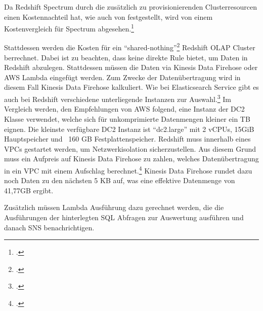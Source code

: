 Da Redshift Spectrum durch die zusätzlich zu provisionierenden Clusterresourcen einen Kostennachteil hat, wie auch von \citeauthor{Tan.2019} festgestellt, wird von einem Kostenvergleich für Spectrum abgesehen.\footcite[Vgl.][2178]{Tan.2019}

Stattdessen werden die Kosten für ein \enquote{shared-nothing}\footcite[Vgl.][2172]{Tan.2019} Redshift \ac{OLAP} Cluster berrechnet. Dabei ist zu beachten, dass \AWSIOT{} keine direkte Rule bietet, um Daten in Redshift abzulegen. Stattdessen müssen die Daten via Kinesis Data Firehose oder \ac{AWS} Lambda eingefügt werden. Zum Zwecke der Datenübertragung wird in diesem Fall Kinesis Data Firehose kalkuliert. Wie bei Elasticsearch Service gibt es auch bei Redshift verschiedene unterliegende Instanzen zur Auswahl.\footcite[Vgl. auch im Folgenden][]{AmazonWebServicesInc..o.J.z} Im Vergleich werden, den Empfehlungen von \ac{AWS} folgend, eine Instanz der \ac{DC2} Klasse verwendet, welche sich für unkomprimierte Datenmengen kleiner ein TB eignen. Die kleinste verfügbare \ac{DC2} Instanz ist \enquote{dc2.large} mit 2 vCPUs, 15GiB Hauptspeicher und ~160 GB Festplattenspeicher. Redshift muss innerhalb eines \acp{VPC} gestartet werden, um Netzwerkisolation sicherzustellen. Aus diesem Grund muss ein Aufpreis auf Kinesis Data Firehose zu zahlen, welches Datenübertragung in ein \ac{VPC} mit einem Aufschlag berechnet.\footcite[Vgl. auch im Folgenden][]{AmazonWebServicesInc..o.J.y} Kinesis Data Firehose rundet dazu noch Daten zu den nächsten 5 KB auf, was eine effektive Datenmenge von 41,77GB ergibt.

Zusätzlich müssen Lambda Ausführung dazu gerechnet werden, die die Ausführungen der hinterlegten \ac{SQL} Abfragen zur Auswertung ausführen und danach \ac{SNS} benachrichtigen.

